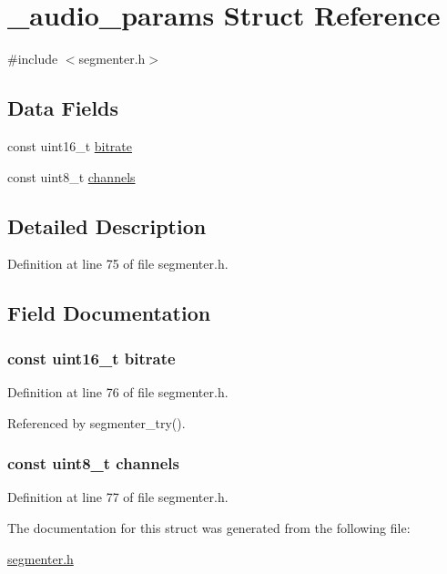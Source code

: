 \hypertarget{struct__audio__params}{\section{\-\_\-audio\-\_\-params \-Struct \-Reference}
\label{struct__audio__params}
}


{\ttfamily \#include $<$segmenter.\-h$>$}

\subsection*{\-Data \-Fields}
\begin{DoxyCompactItemize}
\item 
const uint16\-\_\-t \hyperlink{struct__audio__params_a90d9d9cc76bdecc14ce1bcda108dbc6c}{bitrate}
\item 
const uint8\-\_\-t \hyperlink{struct__audio__params_a50742bb65a8a9a00e12774189d49a2fc}{channels}
\end{DoxyCompactItemize}


\subsection{\-Detailed \-Description}


\-Definition at line 75 of file segmenter.\-h.



\subsection{\-Field \-Documentation}
\hypertarget{struct__audio__params_a90d9d9cc76bdecc14ce1bcda108dbc6c}{
\subsubsection[{bitrate}]{\setlength{\rightskip}{0pt plus 5cm}const uint16\-\_\-t {\bf bitrate}}}\label{struct__audio__params_a90d9d9cc76bdecc14ce1bcda108dbc6c}


\-Definition at line 76 of file segmenter.\-h.



\-Referenced by segmenter\-\_\-try().

\hypertarget{struct__audio__params_a50742bb65a8a9a00e12774189d49a2fc}{
\subsubsection[{channels}]{\setlength{\rightskip}{0pt plus 5cm}const uint8\-\_\-t {\bf channels}}}\label{struct__audio__params_a50742bb65a8a9a00e12774189d49a2fc}


\-Definition at line 77 of file segmenter.\-h.



\-The documentation for this struct was generated from the following file\-:\begin{DoxyCompactItemize}
\item 
\hyperlink{segmenter_8h}{segmenter.\-h}\end{DoxyCompactItemize}
